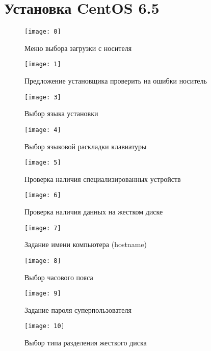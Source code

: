 \section{Установка CentOS 6.5} \label{pril:a}

\begin{figure}[ht]
    \centering
	\texttt{[image: 0]}
	\caption{Меню выбора загрузки с носителя}
\end{figure}

\begin{figure}[ht]
    \centering
	\texttt{[image: 1]}
	\caption{Предложение установщика проверить на ошибки носитель}
\end{figure}

\begin{figure}[ht]
    \centering
	\texttt{[image: 3]}
	\caption{Выбор языка установки}
\end{figure}

\begin{figure}[ht]
    \centering
	\texttt{[image: 4]}
	\caption{Выбор языковой раскладки клавиатуры}
\end{figure}

\begin{figure}[ht]
    \centering
	\texttt{[image: 5]}
	\caption{Проверка наличия специализированных устройств}
\end{figure}

\begin{figure}[ht]
    \centering
	\texttt{[image: 6]}
	\caption{Проверка наличия данных на жестком диске}
\end{figure}

\begin{figure}[ht]
    \centering
	\texttt{[image: 7]}
	\caption{Задание имени компьютера (hostname)}
\end{figure}

\begin{figure}[ht]
    \centering
	\texttt{[image: 8]}
	\caption{Выбор часового пояса}
\end{figure}

\begin{figure}[ht]
    \centering
	\texttt{[image: 9]}
	\caption{Задание пароля суперпользователя}
\end{figure}

\begin{figure}[ht]
    \centering
	\texttt{[image: 10]}
	\caption{Выбор типа разделения жесткого диска}
\end{figure}

